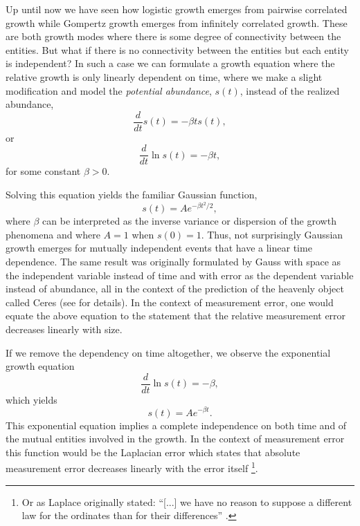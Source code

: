 \documentclass{article}
\begin{document}
Up until now we have seen how logistic growth emerges from pairwise correlated growth while Gompertz growth emerges from infinitely correlated growth. These are both growth modes where there is some degree of connectivity between the entities. But what if there is no connectivity between the entities but each entity is independent? In such a case we can formulate a growth equation where the relative growth is only linearly dependent on time, where we make a slight modification and model the \textit{potential abundance}, $s(t)$, instead of the realized abundance,
\begin{equation}
  \frac{d}{dt}s(t) = - \beta t s(t),
\end{equation}
or 
\begin{equation}
  \frac{d}{dt}\ln s(t) = - \beta t,
\end{equation}
for some constant $\beta>0$. 
 
Solving this equation yields the familiar Gaussian function, 
\begin{equation}
  s(t) = A e^{ - \beta t^2 / 2},
\end{equation}
where $\beta$ can be interpreted as the inverse variance or dispersion of the growth phenomena and where $A=1$ when $s(0)=1$. Thus, not surprisingly Gaussian growth emerges for mutually independent events that have a linear time dependence. The same result was originally formulated by Gauss with space as the independent variable instead of time and with error as the dependent variable instead of abundance, all in the context of the prediction of the heavenly object called Ceres \cite{gauss1857theory} (see \cite{stahl2006evolution} for details). In the context of measurement error, one would equate the above equation to the statement that the relative measurement error decreases linearly with size. 

If we remove the dependency on time altogether, we observe the exponential growth equation
\begin{equation}
  \frac{d}{dt}\ln s(t) = - \beta,
\end{equation}
which yields 
\begin{equation}
  s(t) = A e^{ - \beta t}.
\end{equation}
This exponential equation implies a complete independence on both time and of the mutual entities involved in the growth. In the context of measurement error this function would be the Laplacian error which states that absolute measurement error decreases linearly with the error itself \footnote{Or as Laplace originally stated: ``[...] we have no reason to suppose a different law for the ordinates than for their differences'' \cite{stahl2006evolution}.}. 
\end{document}
